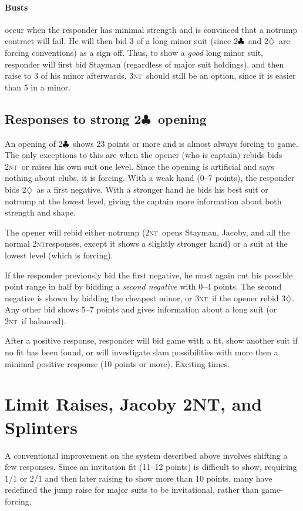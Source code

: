 \documentclass[11pt]{article}
\def\C{$\clubsuit$}
\def\D{$\diamondsuit$}
\def\NT{\textsc{nt}}
\begin{document}
\paragraph{Busts} occur when the responder has minimal strength and is
convinced that a notrump contract will fail.  He will then bid 3 of a
long minor suit (since 2\C\ and 2\D\ are forcing conventions) as a
sign off.  Thus, to show a \emph{good} long minor suit, responder will
first bid Stayman (regardless of major suit holdings), and then raise
to 3 of his minor afterwards.  3\NT\ should still be an option, since
it is easier than 5 in a minor.


\subsection{Responses to strong 2\C\ opening}

An opening of 2\C\ shows 23 points or more and is almost always forcing
to game.  The only exceptions to this are when the opener (who is captain)
rebids bids 2\NT\ or raises his own suit one level.  Since the opening
is artificial and says nothing about clubs, it is forcing.  With a weak
hand (0--7 points), the responder bids 2\D\ as a first negative.  With
a stronger hand he bids his best suit or notrump at the lowest level,
giving the captain more information about both strength and shape.

The opener will rebid either notrump (2\NT\ opens Stayman, Jacoby, and
all the normal 2\NT responses, except it shows a slightly stronger hand)
or a suit at the lowest level (which is forcing).

If the responder previously bid the first negative, he must again cut
his possible point range in half by bidding a \emph{second negative}
with 0--4 points.  The second negative is shown by bidding the
cheapest minor, or 3\NT\ if the opener rebid 3\D.  Any other bid shows
5--7 points and gives information about a long suit (or 2\NT\ if balanced).

After a positive response, responder will bid game with a fit, show another
suit if no fit has been found, or will investigate slam possibilities with
more then a minimal positive response (10 points or more).  Exciting times.


\section{Limit Raises, Jacoby 2NT, and Splinters}

A conventional improvement on the system described above involves
shifting a few responses.  Since an invitation fit (11--12 points)
is difficult to show, requiring 1/1 or 2/1 and then later raising
to show more than 10 points, many have redefined the jump raise for
major suits to be invitational, rather than game-forcing.
\end{document}
